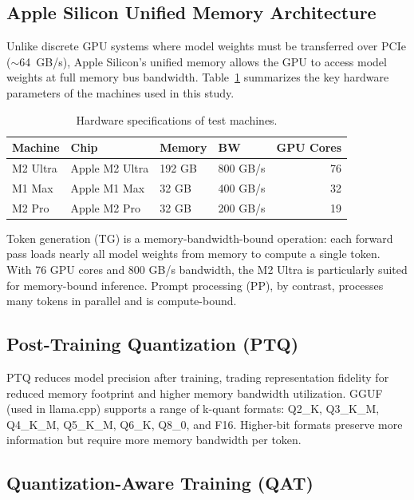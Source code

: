 \documentclass[11pt,a4paper]{article}
\begin{document}
\subsection{Apple Silicon Unified Memory Architecture}

Unlike discrete GPU systems where model weights must be transferred over PCIe
($\sim$64~GB/s), Apple Silicon's unified memory allows the GPU to access model
weights at full memory bus bandwidth.
Table~\ref{tab:hardware} summarizes the key hardware parameters of the machines
used in this study.

\begin{table}[h]
\centering
\caption{Hardware specifications of test machines.}
\label{tab:hardware}
\begin{tabular}{llllr}
\toprule
\textbf{Machine} & \textbf{Chip} & \textbf{Memory} & \textbf{BW} & \textbf{GPU Cores} \\
\midrule
M2 Ultra & Apple M2 Ultra & 192 GB & 800 GB/s & 76 \\
M1 Max   & Apple M1 Max   &  32 GB & 400 GB/s & 32 \\
M2 Pro   & Apple M2 Pro   &  32 GB & 200 GB/s & 19 \\
\bottomrule
\end{tabular}
\end{table}

Token generation (TG) is a memory-bandwidth-bound operation: each forward pass
loads nearly all model weights from memory to compute a single token.
With 76 GPU cores and 800 GB/s bandwidth, the M2 Ultra is particularly suited
for memory-bound inference.
Prompt processing (PP), by contrast, processes many tokens in parallel and is
compute-bound.

\subsection{Post-Training Quantization (PTQ)}

PTQ reduces model precision after training, trading representation fidelity for
reduced memory footprint and higher memory bandwidth utilization.
GGUF~\cite{gguf} (used in llama.cpp) supports a range of k-quant formats:
Q2\_K, Q3\_K\_M, Q4\_K\_M, Q5\_K\_M, Q6\_K, Q8\_0, and F16.
Higher-bit formats preserve more information but require more memory bandwidth
per token.

\subsection{Quantization-Aware Training (QAT)}
\end{document}
